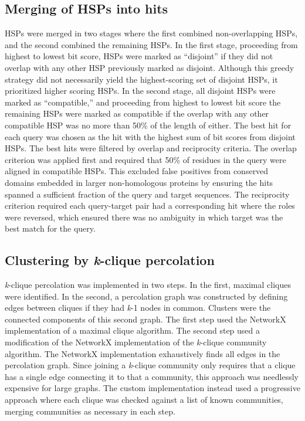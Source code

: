 \subsection{Merging of HSPs into hits}
HSPs were merged in two stages where the first combined non-overlapping HSPs, and the second combined the remaining HSPs. In the first stage, proceeding from highest to lowest bit score, HSPs were marked as ``disjoint'' if they did not overlap with any other HSP previously marked as disjoint. Although this greedy strategy did not necessarily yield the highest-scoring set of disjoint HSPs, it prioritized higher scoring HSPs. In the second stage, all disjoint HSPs were marked as ``compatible,'' and proceeding from highest to lowest bit score the remaining HSPs were marked as compatible if the overlap with any other compatible HSP was no more than 50\% of the length of either. The best hit for each query was chosen as the hit with the highest sum of bit scores from disjoint HSPs. The best hits were filtered by overlap and reciprocity criteria. The overlap criterion was applied first and required that 50\% of residues in the query were aligned in compatible HSPs. This excluded false positives from conserved domains embedded in larger non-homologous proteins by ensuring the hits spanned a sufficient fraction of the query and target sequences. The reciprocity criterion required each query-target pair had a corresponding hit where the roles were reversed, which ensured there was no ambiguity in which target was the best match for the query.

\subsection{Clustering by \textit{k}-clique percolation}
\textit{k}-clique percolation was implemented in two steps. In the first, maximal cliques were identified. In the second, a percolation graph was constructed by defining edges between cliques if they had \textit{k}-1 nodes in common. Clusters were the connected components of this second graph. The first step used the NetworkX implementation of a maximal clique algorithm. The second step used a modification of the NetworkX implementation of the \textit{k}-clique community algorithm. The NetworkX implementation exhaustively finds all edges in the percolation graph. Since joining a \textit{k}-clique community only requires that a clique has a single edge connecting it to that a community, this approach was needlessly expensive for large graphs. The custom implementation instead used a progressive approach where each clique was checked against a list of known communities, merging communities as necessary in each step.

